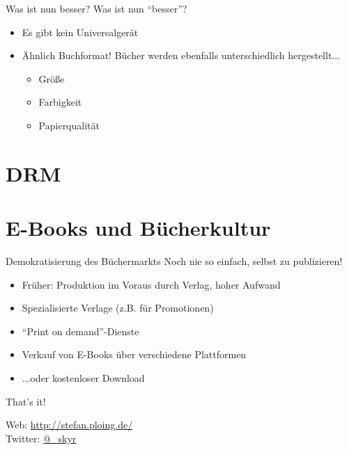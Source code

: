 \documentclass[hyperref={pdfpagelabels=false}]{beamer}
\begin{document}
\begin{frame}{Was ist nun besser?}
	Was ist nun "`besser"'?
\begin{itemize}
		\item Es gibt kein Universalgerät
		\item Ähnlich Buchformat! Bücher werden ebenfalls unterschiedlich hergestellt...
		\begin{itemize}
			\item Größe
			\item Farbigkeit
			\item Papierqualität
		\end{itemize}
	\end{itemize}
\end{frame}


\section{DRM}




\section{E-Books und Bücherkultur}

\begin{frame}{Demokratisierung des Büchermarkts}
	Noch nie so einfach, selbst zu publizieren!
	\begin{itemize}
		\item Früher: Produktion im Voraus durch Verlag, hoher Aufwand
		\item<2-> Spezialisierte Verlage (z.B. für Promotionen)
		\item<3-> "`Print on demand"'-Dienste
		\item<4-> Verkauf von E-Books über verschiedene Plattformen
		\item<4-> ...oder kostenloser Download
	\end{itemize}
\end{frame}


\begin{frame}[plain]
	That's it!
	\begin{center}
	\end{center}
	\begin{center}
		Web: \url{http://stefan.ploing.de/} \\
		Twitter: \href{https://twitter.com/\_skyr}{@\_skyr}
	\end{center}
\end{frame}


\end{document}
